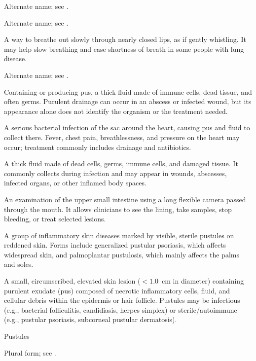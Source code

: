  Alternate name; see .

 Alternate name; see .

 A way to breathe out slowly through nearly closed lips, as if gently whistling. It may help slow breathing and ease shortness of breath in some people with lung disease.

 Alternate name; see .

 Containing or producing pus, a thick fluid made of immune cells, dead tissue, and often germs. Purulent drainage can occur in an abscess or infected wound, but its appearance alone does not identify the organism or the treatment needed.

 A serious bacterial infection of the sac around the heart, causing pus and fluid to collect there. Fever, chest pain, breathlessness, and pressure on the heart may occur; treatment commonly includes drainage and antibiotics.

 A thick fluid made of dead cells, germs, immune cells, and damaged tissue. It commonly collects during infection and may appear in wounds, abscesses, infected organs, or other inflamed body spaces.

 An examination of the upper small intestine using a long flexible camera passed through the mouth. It allows clinicians to see the lining, take samples, stop bleeding, or treat selected lesions.

 A group of inflammatory skin diseases marked by visible, sterile pustules on reddened skin. Forms include generalized pustular psoriasis, which affects widespread skin, and palmoplantar pustulosis, which mainly affects the palms and soles.

 A small, circumscribed, elevated skin lesion ($<1.0$~cm in diameter) containing purulent exudate (pus) composed of necrotic inflammatory cells, fluid, and cellular debris within the epidermis or hair follicle. Pustules may be infectious (e.g., bacterial folliculitis, candidiasis, herpes simplex) or sterile/autoimmune (e.g., pustular psoriasis, subcorneal pustular dermatosis).

\synonyms
Pustules

 Plural form; see .

